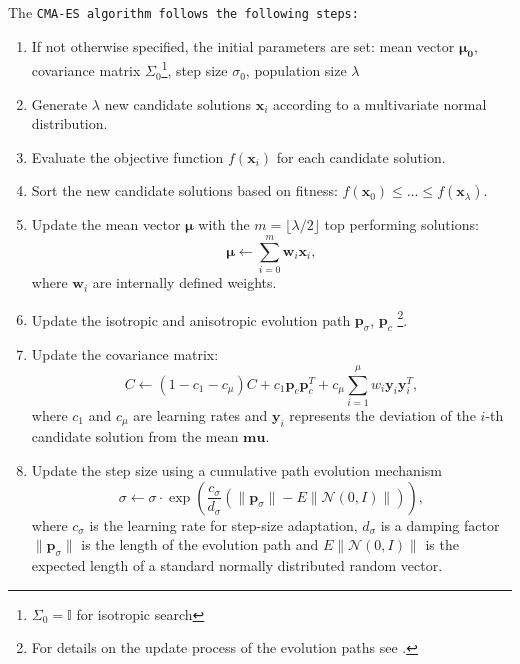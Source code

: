 The \tt{CMA-ES} algorithm follows the following steps:\begin{enumerate}
    \item If not otherwise specified, the initial parameters are set: mean vector $\mathbf{\mu_0}$, covariance matrix $\Sigma_0$\footnote{$\Sigma_0=\mathbb{I}$ for isotropic search}, step size $\sigma_0$, population size $\lambda$
    \item Generate $\lambda$ new candidate solutions $\mathbf{x}_i$ according to a multivariate normal distribution.
    \item Evaluate the objective function $f(\mathbf{x}_i)$ for each candidate solution.
    \item Sort the new candidate solutions based on fitness: $f(\mathbf{x}_0) \leq ... \leq f(\mathbf{x}_{\lambda})$.
    \item Update the mean vector $\mathbf{\mu}$ with the $m=\lfloor \lambda / 2 \rfloor$ top performing solutions:\begin{equation}
        \mathbf{\mu} \leftarrow \sum_{i=0}^m \mathbf{w}_i\mathbf{x}_i,
    \end{equation} where $\mathbf{w}_i$ are internally defined weights.
    \item Update the isotropic and anisotropic evolution path $\mathbf{p}_{\sigma}$, $\mathbf{p}_c$ \footnote{For details on the update process of the evolution paths see \cite{cmaessimplepractical}.}.
    \item Update the covariance matrix: \begin{equation}
        C \leftarrow (1 - c_1 - c_{\mu}) C + c_1 \mathbf{p}_c \mathbf{p}_c^T + c_{\mu} \sum_{i=1}^{\mu} w_i \mathbf{y}_i \mathbf{y}_i^T,
    \end{equation} where $c_1$ and $c_\mu$ are learning rates and $\mathbf{y}_i$ represents the deviation of the $i$-th candidate solution from the mean $\mathbf{mu}$.
    \item Update the step size using a cumulative path evolution mechanism \begin{equation}
        \sigma \leftarrow \sigma \cdot \exp \left( \frac{c_{\sigma}}{d_{\sigma}} \left( \| \mathbf{p}_{\sigma} \| - E \| \mathcal{N}(0, I) \| \right) \right),
    \end{equation} where $c_\sigma$ is the learning rate for step-size adaptation, $d_\sigma$ is a damping factor $\| \mathbf{p}_{\sigma} \|$ is the length of the evolution path and $E \| \mathcal{N}(0, I) \|$ is the expected length of a standard normally distributed random vector.
\end{enumerate}

